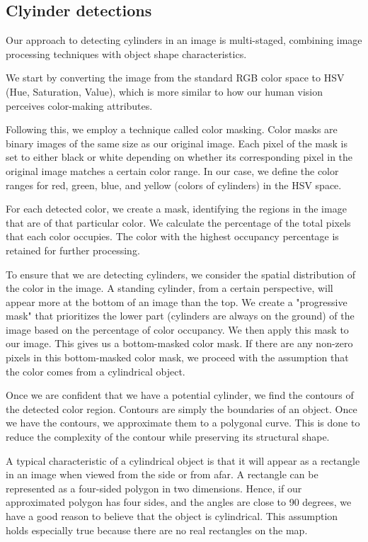 \documentclass{article}
\begin{document}
\subsection{Clyinder detections}
Our approach to detecting cylinders in an image is multi-staged, combining image processing techniques with object shape characteristics. 

We start by converting the image from the standard RGB color space to HSV (Hue, Saturation, Value), which is more similar to how our human vision perceives color-making attributes. 

Following this, we employ a technique called color masking. Color masks are binary images of the same size as our original image. Each pixel of the mask is set to either black or white depending on whether its corresponding pixel in the original image matches a certain color range. In our case, we define the color ranges for red, green, blue, and yellow (colors of cylinders) in the HSV space. 

For each detected color, we create a mask, identifying the regions in the image that are of that particular color. We calculate the percentage of the total pixels that each color occupies. The color with the highest occupancy percentage is retained for further processing.

To ensure that we are detecting cylinders, we consider the spatial distribution of the color in the image. A standing cylinder, from a certain perspective, will appear more at the bottom of an image than the top. We create a "progressive mask" that prioritizes the lower part (cylinders are always on the ground) of the image based on the percentage of color occupancy. We then apply this mask to our image. This gives us a bottom-masked color mask. If there are any non-zero pixels in this bottom-masked color mask, we proceed with the assumption that the color comes from a cylindrical object.

Once we are confident that we have a potential cylinder, we find the contours of the detected color region. Contours are simply the boundaries of an object. Once we have the contours, we approximate them to a polygonal curve. This is done to reduce the complexity of the contour while preserving its structural shape. 

A typical characteristic of a cylindrical object is that it will appear as a rectangle in an image when viewed from the side or from afar. A rectangle can be represented as a four-sided polygon in two dimensions. Hence, if our approximated polygon has four sides, and the angles are close to 90 degrees, we have a good reason to believe that the object is cylindrical. This assumption holds especially true because there are no real rectangles on the map.
\end{document}

